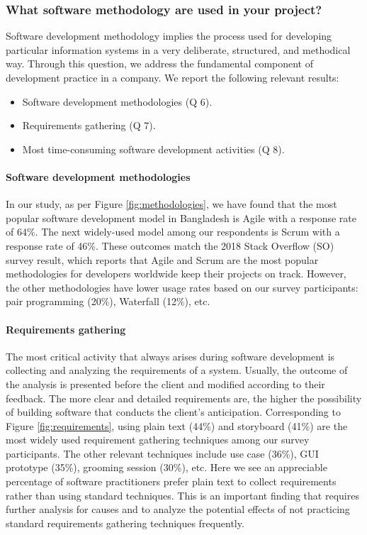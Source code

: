 \subsubsection{What software methodology are used in your project?}
\label{methodology}

Software development methodology implies the process used for developing particular information systems in a very deliberate, structured, and methodical way. Through this question, we address the fundamental component of development practice in a company. We report the following relevant results:

\begin{itemize}
\item Software development methodologies (Q 6).
\item Requirements gathering (Q 7).
\item Most time-consuming software development activities (Q 8).
\end{itemize}


\paragraph{Software development methodologies}
In our study, as per Figure \ref{fig:methodologies}, we have found that the most popular software development model in Bangladesh is Agile with a response rate of 64\%. The next widely-used model among our respondents is Scrum with a response rate of 46\%. These outcomes match the 2018 Stack Overflow (SO) survey \cite{StackoverflowSurvey2018} result, which reports that Agile and Scrum are the most popular methodologies for developers worldwide keep their projects on track. However, the other methodologies have lower usage rates based on our survey participants: pair programming (20\%), Waterfall (12\%), etc.


\paragraph{Requirements gathering}
The most critical activity that always arises during software development is collecting and analyzing the requirements of a system. Usually, the outcome of the analysis is presented before the client and modified according to their feedback. The more clear and detailed requirements are, the higher the possibility of building software that conducts the client’s anticipation. Corresponding to Figure \ref{fig:requirements}, using plain text (44\%) and storyboard (41\%) are the most widely used requirement gathering techniques among our survey participants. The other relevant techniques include use case (36\%), GUI prototype (35\%), grooming session (30\%), etc. Here we see an appreciable percentage of software practitioners prefer plain text to collect requirements rather than using standard techniques. This is an important finding that requires further analysis for causes and to analyze the potential effects of not practicing standard requirements gathering techniques frequently.

